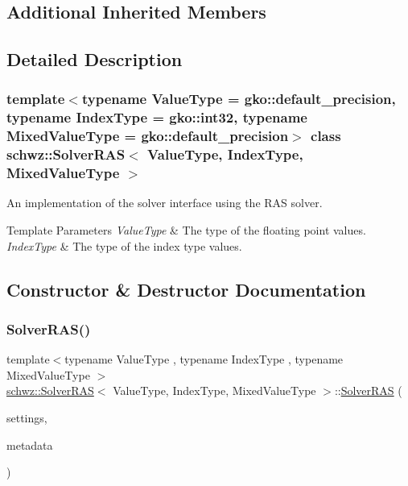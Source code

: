 \subsection*{Additional Inherited Members}


\subsection{Detailed Description}
\subsubsection*{template$<$typename Value\+Type = gko\+::default\+\_\+precision, typename Index\+Type = gko\+::int32, typename Mixed\+Value\+Type = gko\+::default\+\_\+precision$>$\newline
class schwz\+::\+Solver\+R\+A\+S$<$ Value\+Type, Index\+Type, Mixed\+Value\+Type $>$}

An implementation of the solver interface using the R\+AS solver. 


\begin{DoxyTemplParams}{Template Parameters}
{\em Value\+Type} & The type of the floating point values. \\
\hline
{\em Index\+Type} & The type of the index type values. \\
\hline
\end{DoxyTemplParams}


\subsection{Constructor \& Destructor Documentation}
\mbox{\label{classschwz_1_1SolverRAS_afc4b02a6ec47a155f6a7822d1615fd9c}} 
\subsubsection{\texorpdfstring{Solver\+R\+A\+S()}{SolverRAS()}}
{\footnotesize\ttfamily template$<$typename Value\+Type , typename Index\+Type , typename Mixed\+Value\+Type $>$ \\
\hyperlink{classschwz_1_1SolverRAS}{schwz\+::\+Solver\+R\+AS}$<$ Value\+Type, Index\+Type, Mixed\+Value\+Type $>$\+::\hyperlink{classschwz_1_1SolverRAS}{Solver\+R\+AS} (\begin{DoxyParamCaption}\item[{\hyperlink{structschwz_1_1Settings}{Settings} \&}]{settings,  }\item[{\hyperlink{structschwz_1_1Metadata}{Metadata}$<$ Value\+Type, Index\+Type $>$ \&}]{metadata }\end{DoxyParamCaption})}



